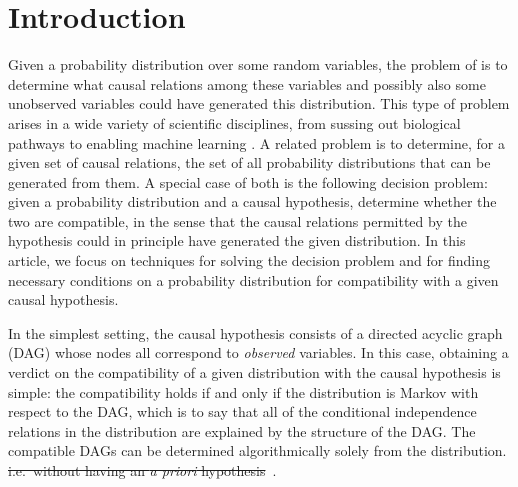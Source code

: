 
\section{Introduction}

Given a probability distribution over some random variables, the problem of  is to determine what causal relations among these variables and possibly also some unobserved variables could have generated this distribution. This type of problem arises in a wide variety of scientific disciplines, from sussing out biological pathways to enabling machine learning \cite{pearl2009causality,spirtes2011causation,studeny2005probabilistic,koller2009probabilistic}. A related problem is to determine, for a given set of causal relations, the set of all probability distributions that can be generated from them.   
A special case of both is the following decision problem: given a probability distribution and a causal hypothesis, 
determine whether the two are compatible, in the sense that the causal relations permitted by the hypothesis could in principle have generated the given distribution. 
In this article, we focus on techniques for solving the decision problem and for finding necessary conditions on a probability distribution for compatibility with a given causal hypothesis.


In the simplest setting, the causal hypothesis consists of a directed acyclic graph (DAG) whose nodes all correspond to {\em observed} variables. In this case, obtaining a verdict on the compatibility of a given distribution with the causal hypothesis is simple: the compatibility holds if and only if the distribution is Markov with respect to the DAG, which is to say that all of the conditional independence relations in the distribution are explained by the structure of the DAG. The compatible DAGs can be determined algorithmically solely from the distribution. \sout{ i.e.~without having an \emph{a priori} hypothesis}~\cite{pearl2009causality}.

